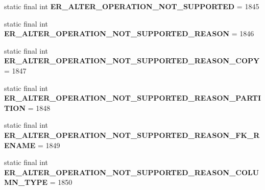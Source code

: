 \begin{DoxyCompactItemize}
\item 
\mbox{\label{classcom_1_1mysql_1_1cj_1_1exceptions_1_1_mysql_error_numbers_a73dac4bbabc0fc3ecf6af51fdcccc5cb}} 
static final int {\bfseries E\+R\+\_\+\+A\+L\+T\+E\+R\+\_\+\+O\+P\+E\+R\+A\+T\+I\+O\+N\+\_\+\+N\+O\+T\+\_\+\+S\+U\+P\+P\+O\+R\+T\+ED} = 1845
\item 
\mbox{\label{classcom_1_1mysql_1_1cj_1_1exceptions_1_1_mysql_error_numbers_ae14b0d80017f2d1b050f4f617b10006c}} 
static final int {\bfseries E\+R\+\_\+\+A\+L\+T\+E\+R\+\_\+\+O\+P\+E\+R\+A\+T\+I\+O\+N\+\_\+\+N\+O\+T\+\_\+\+S\+U\+P\+P\+O\+R\+T\+E\+D\+\_\+\+R\+E\+A\+S\+ON} = 1846
\item 
\mbox{\label{classcom_1_1mysql_1_1cj_1_1exceptions_1_1_mysql_error_numbers_ac6f5145a4c57b51276a0a7580761abe1}} 
static final int {\bfseries E\+R\+\_\+\+A\+L\+T\+E\+R\+\_\+\+O\+P\+E\+R\+A\+T\+I\+O\+N\+\_\+\+N\+O\+T\+\_\+\+S\+U\+P\+P\+O\+R\+T\+E\+D\+\_\+\+R\+E\+A\+S\+O\+N\+\_\+\+C\+O\+PY} = 1847
\item 
\mbox{\label{classcom_1_1mysql_1_1cj_1_1exceptions_1_1_mysql_error_numbers_a2886c6de4ee3b184dc10b1fe97be5f59}} 
static final int {\bfseries E\+R\+\_\+\+A\+L\+T\+E\+R\+\_\+\+O\+P\+E\+R\+A\+T\+I\+O\+N\+\_\+\+N\+O\+T\+\_\+\+S\+U\+P\+P\+O\+R\+T\+E\+D\+\_\+\+R\+E\+A\+S\+O\+N\+\_\+\+P\+A\+R\+T\+I\+T\+I\+ON} = 1848
\item 
\mbox{\label{classcom_1_1mysql_1_1cj_1_1exceptions_1_1_mysql_error_numbers_a5ef6fa6466c2bad073e5c5d38dff0802}} 
static final int {\bfseries E\+R\+\_\+\+A\+L\+T\+E\+R\+\_\+\+O\+P\+E\+R\+A\+T\+I\+O\+N\+\_\+\+N\+O\+T\+\_\+\+S\+U\+P\+P\+O\+R\+T\+E\+D\+\_\+\+R\+E\+A\+S\+O\+N\+\_\+\+F\+K\+\_\+\+R\+E\+N\+A\+ME} = 1849
\item 
\mbox{\label{classcom_1_1mysql_1_1cj_1_1exceptions_1_1_mysql_error_numbers_a5e33de899ede619a64e9f221c38e38aa}} 
static final int {\bfseries E\+R\+\_\+\+A\+L\+T\+E\+R\+\_\+\+O\+P\+E\+R\+A\+T\+I\+O\+N\+\_\+\+N\+O\+T\+\_\+\+S\+U\+P\+P\+O\+R\+T\+E\+D\+\_\+\+R\+E\+A\+S\+O\+N\+\_\+\+C\+O\+L\+U\+M\+N\+\_\+\+T\+Y\+PE} = 1850

\end{DoxyCompactItemize}
